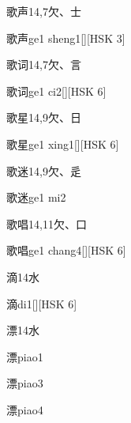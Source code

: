 \begin{entry}{歌声}{14,7}{⽋、⼠}
  \begin{phonetics}{歌声}{ge1 sheng1}[][HSK 3]
  \end{phonetics}
\end{entry}

\begin{entry}{歌词}{14,7}{⽋、⾔}
  \begin{phonetics}{歌词}{ge1 ci2}[][HSK 6]
  \end{phonetics}
\end{entry}

\begin{entry}{歌星}{14,9}{⽋、⽇}
  \begin{phonetics}{歌星}{ge1 xing1}[][HSK 6]
  \end{phonetics}
\end{entry}

\begin{entry}{歌迷}{14,9}{⽋、⾡}
  \begin{phonetics}{歌迷}{ge1 mi2}
  \end{phonetics}
\end{entry}

\begin{entry}{歌唱}{14,11}{⽋、⼝}
  \begin{phonetics}{歌唱}{ge1 chang4}[][HSK 6]
  \end{phonetics}
\end{entry}

\begin{entry}{滴}{14}{⽔}
  \begin{phonetics}{滴}{di1}[][HSK 6]
  \end{phonetics}
\end{entry}

\begin{entry}{漂}{14}{⽔}
  \begin{phonetics}{漂}{piao1}
  \end{phonetics}
  \begin{phonetics}{漂}{piao3}
  \end{phonetics}
  \begin{phonetics}{漂}{piao4}
  \end{phonetics}
\end{entry}

